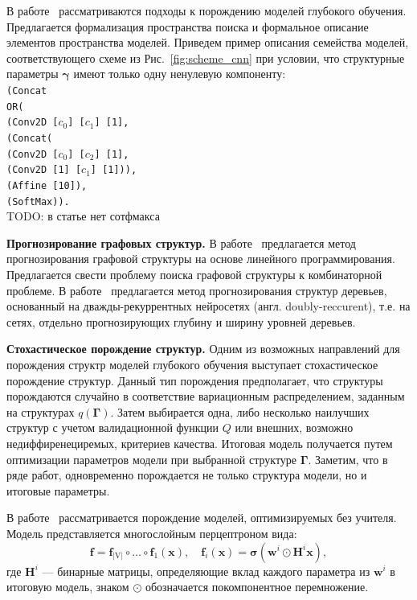 В работе~\cite{search_space} рассматриваются подходы к порождению моделей глубокого обучения. Предлагается формализация пространства поиска и формальное описание элементов  пространства моделей. Приведем пример описания семейства моделей, соответствующего схеме из Рис.~\ref{fig:scheme_cnn} при условии, что структурные параметры $\boldsymbol{\gamma}$ имеют только одну ненулевую компоненту:\\
\texttt{(Concat\\
\text{\quad}OR(\\
\text{\quad\quad}(Conv2D [$c_0$] [$c_1$] [1],\\
\text{\quad\quad}(Concat(\\
\text{\quad\quad\quad}(Conv2D [$c_0$] [$c_2$] [1],\\
\text{\quad\quad\quad}(Conv2D [1] [$c_1$] [1])),\\
\text{\quad}(Affine [10]),\\
\text{\quad}(SoftMax)).} \\
TODO: в статье нет сотфмакса


\textbf{Прогнозирование графовых структур. }
В работе~\cite{jaakkola2010learning} предлагается метод прогнозирования графовой структуры на основе линейного программирования. Предлагается свести проблему поиска графовой структуры к комбинаторной проблеме.
В работе~\cite{double_rnn} предлагается метод прогнозирования структур деревьев, основанный на дважды-рекуррентных нейросетях (англ. doubly-reccurent), т.е. на сетях, отдельно прогнозирующих глубину и ширину уровней деревьев.

\par{\textbf{Стохастическое порождение структур. }}
Одним из возможных направлений для порождения структр моделей глубокого обучения выступает стохастическое порождение структур.
Данный тип порождения предполагает, что структуры порождаются случайно в соответствие  вариационным распределением, заданным на структурах $q(\boldsymbol{\Gamma})$. Затем выбирается одна, либо несколько наилучших структур с учетом валидационной функции $Q$ или внешних, возможно недиффиренециремых, критериев качества. Итоговая модель получается путем оптимизации параметров модели при выбранной структуре $\boldsymbol{\Gamma}$. 
Заметим, что в ряде работ, одновременно порождается не только структура модели, но и итоговые параметры.

В работе~\cite{cib} рассматривается порождение моделей, оптимизируемых без учителя. Модель представляется многослойным перцептроном вида:
\[
    \mathbf{f} = \mathbf{f}_\text{|V|} \circ \dots \circ \mathbf{f}_1 (\mathbf{x}), \quad \mathbf{f}_i(\mathbf{x}) = \boldsymbol{\sigma}(\mathbf{w}^i \odot \mathbf{H}^i \mathbf{x}),
\]
где $\mathbf{H}^i$ --- бинарные матрицы, определяющие вклад каждого параметра из $\mathbf{w}^i$ в итоговую модель, знаком $\odot$  обозначается покомпонентное перемножение. 

